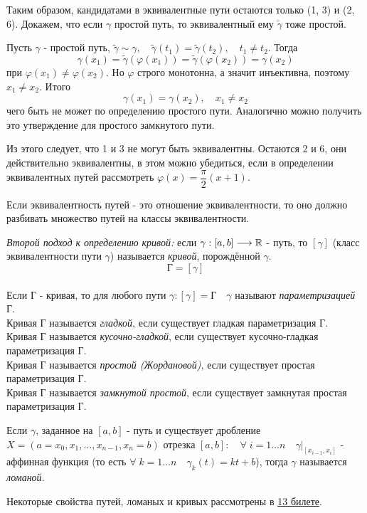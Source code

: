 \documentclass[../main.tex]{subfiles}
\begin{document}
\begin{example}
    Таким образом, кандидатами в эквивалентные пути остаются только (1, 3) и (2, 6). Докажем, что если \( \gamma \) простой путь, то эквивалентный ему \( \tilde{ \gamma }\) тоже простой. 

    Пусть \( \gamma \) - простой путь, \( \tilde{ \gamma } \sim \gamma,\quad  \tilde{ \gamma }\left( t_1\right)= \tilde{ \gamma } \left( t_2\right),\quad t_1 \neq t_2\). Тогда 
    \[ \gamma \left( x_1\right)= \tilde{ \gamma }\left( \varphi \left( x_1\right)\right)= \tilde{ \gamma }\left( \varphi \left( x_2\right)\right)= \gamma \left( x_2\right)\]
    при \( \varphi \left( x_1\right) \neq \varphi \left( x_2\right)\). Но \( \varphi \) строго монотонна, а значит инъективна, поэтому \( x_1 \neq x_2\). Итого
    \[ \gamma \left( x_1\right)= \gamma \left( x_2\right),\quad x_1 \neq x_2\]
    чего быть не может по определению простого пути. Аналогично можно получить это утверждение для простого замкнутого пути. 

    Из этого следует, что 1 и 3 не могут быть эквивалентны. Остаются 2 и 6, они действительно эквивалентны, в этом можно убедиться, если в определении эквивалентных путей рассмотреть \( \varphi\left( x\right)=\dfrac{ \pi}{ 2}\left( x+1\right) \).
\end{example}

Если эквивалентность путей - это отношение эквивалентности, то оно должно разбивать множество путей на классы эквивалентности. 

\emph{Второй подход к определению кривой:} если \( \gamma :\left[ a,b\right] \longrightarrow \mathbb{R} \) - путь, то \( \left[ \gamma \right]\) (класс эквивалентности пути \( \gamma \)) называется \emph{кривой}, порождённой \( \gamma \). 
\[ \text{Г}=\left[ \gamma \right]\]
\\
Если Г - кривая, то для любого пути \( \gamma: \left[ \gamma \right]=\text{Г}\quad  \gamma \) называют \emph{параметризацией} Г.
\\
Кривая Г называется \emph{гладкой}, если существует гладкая параметризация Г.
\\
Кривая Г называется \emph{кусочно-гладкой}, если существует кусочно-гладкая параметризация Г.
\\
Кривая Г называется \emph{простой (Жордановой)}, если существует простая параметризация Г.
\\
Кривая Г называется \emph{замкнутой простой}, если существует замкнутая простая параметризация Г.

Если \( \gamma \), заданное на \( \left[ a,b\right]\) - путь и существует дробление \( X=\left( a=x_0, x_1, \dots,x_{n-1}, x_n=b\right)\) отрезка \( \left[ a,b\right]:\quad  \forall \; i=1 \dots n\quad \gamma |_{\left[ x_{i-1 },x_i\right]}\) - аффинная функция (то есть \( \forall \; k=1 \dots n\quad \gamma _k\left( t\right)=kt+b\)), тогда \( \gamma \) называется \emph{ломаной}. 

Некоторые свойства путей, ломаных и кривых рассмотрены в \hyperlink{q13}{13 билете}. 
\end{document}
